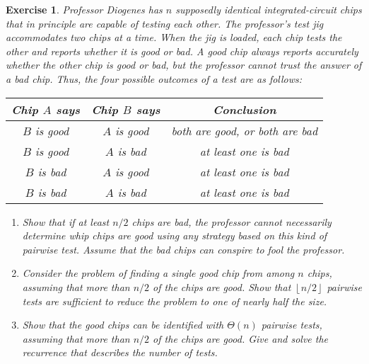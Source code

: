 \documentclass[11pt]{amsart}
\theoremstyle{theorem}
\newtheorem{exercise}{Exercise}
\newcommand{\floor}[1]{\left\lfloor #1 \right\rfloor}
\begin{document}
\begin{exercise}
Professor Diogenes has $n$ supposedly identical integrated-circuit chips that in principle are capable of testing each other. The professor's test jig accommodates two chips at a time. When the jig is loaded, each chip tests the other and reports whether it is good or bad. A good chip always reports accurately whether the other chip is good or bad, but the professor cannot trust the answer of a bad chip. Thus, the four possible outcomes of a test are as follows:
\begin{center}
\begin{tabular}{c c c}
Chip $A$ says & Chip $B$ says & Conclusion \\
\hline
$B$ is good & $A$ is good & both are good, or both are bad \\
$B$ is good & $A$ is bad & at least one is bad \\
$B$ is bad & $A$ is good & at least one is bad \\
$B$ is bad & $A$ is bad & at least one is bad
\end{tabular}
\end{center}
\begin{enumerate}
\item Show that if at least $n/2$ chips are bad, the professor cannot necessarily determine whip chips are good using any strategy based on this kind of pairwise test. Assume that the bad chips can conspire to fool the professor.
\item Consider the problem of finding a single good chip from among $n$ chips, assuming that more than $n/2$ of the chips are good. Show that $\floor{n/2}$ pairwise tests are sufficient to reduce the problem to one of nearly half the size.
\item Show that the good chips can be identified with $\Theta(n)$ pairwise tests, assuming that more than $n/2$ of the chips are good. Give and solve the recurrence that describes the number of tests.
\end{enumerate}
\end{exercise}
\end{document}
